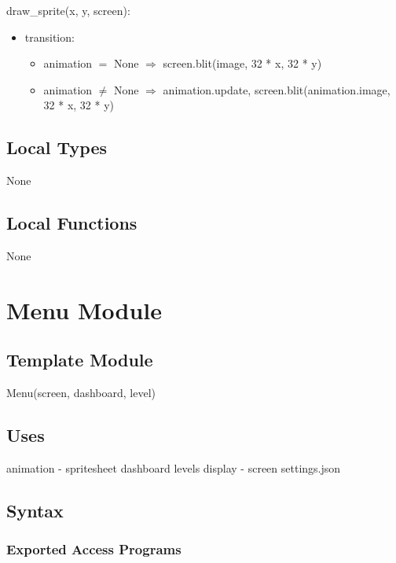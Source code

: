 \documentclass[12pt]{article}
\begin{document}
\noindent draw\_sprite(x, y, screen):
\begin{itemize}
    \item transition: 
    \begin{itemize}[]
        \item animation $=$ None $\Rightarrow$ screen.blit(image, 32 * x, 32 * y)
        \item animation $\neq$ None $\Rightarrow$ animation.update, screen.blit(animation.image, 32 * x, 32 * y)
    \end{itemize}
\end{itemize}

\subsection* {Local Types}

None

\subsection* {Local Functions}

None

\newpage

\section* {Menu Module}

\subsection*{Template Module}

Menu(screen, dashboard, level)

\subsection* {Uses}

animation - spritesheet
dashboard
levels
display - screen
settings.json

\subsection* {Syntax}

\subsubsection* {Exported Access Programs}
\end{document}
